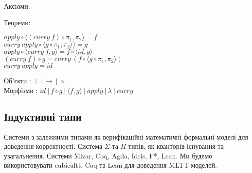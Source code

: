 \begin{fullwidth}
\hspace{-2cm}
\begingroup
\parbox[t][][l]{0.40\textwidth}{

    Аксіоми:

\begin{prooftree}
\end{prooftree}

\begin{prooftree}
\end{prooftree}

\begin{prooftree}
\end{prooftree}

}
\hspace{1cm}
\parbox[t][][r]{0.60\textwidth}{

Теореми:

\begin{center}
$apply \circ \langle (curry\ f) \circ \pi_1 , \pi_2 \rangle = f$\\
$curry\ apply \circ \langle g \circ \pi_1, \pi_2 \rangle) = g$\\
$apply \circ \langle curry\ f, g \rangle = f \circ \langle id , g\rangle$\\
$(curry\ f) \circ g = curry\ (f \circ \langle g \circ \pi_1,\pi_2\rangle)$\\
$curry\ apply = id$\\
\end{center}
}
\endgroup
\end{fullwidth}

\begin{center}
Об’єкти : $\bot\ |\ \rightarrow\ |\ \times$\\
Морфізми : $id\ |\ f \circ g\ |\ \langle f, g \rangle\ |\ apply\ |\ \lambda\ |\ curry$
\end{center}


\newpage
    \subsection{Індуктивні типи}
    Системи з залежними типами як верифікаційні математичні формальні моделі
    для доведення корректності. Система $\Sigma$ та $\Pi$ типів, як кванторів
    існування та узагальнення. Системи Mizar, Coq, Agda, Idris, F*, Lean. Ми будемо
    використовувати cubicaltt, Coq та Lean для доведення MLTT моделей.

